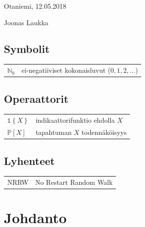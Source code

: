 \documentclass[finnish, 12pt, a4paper, sci, utf8, pdfa]{aaltothesis}
\newcommand{\N}{\mathbb{N}}
\newcommand{\indicator}{\mathopen{\mathds{1}}}
\newcommand*{\prob}{\mathbb{P}}
\begin{document}
\vspace{5cm}
Otaniemi, 12.05.2018

\vspace{5mm}
{\hfill Joonas Laukka \hspace{1cm}}

\newpage


\thesistableofcontents



\subsection*{Symbolit}

\begin{tabular}{ll}
$\N_{0}$  & ei-negatiiviset kokonaisluvut (\( 0, 1, 2, \ldots \))  \\
\end{tabular}

\subsection*{Operaattorit}

\begin{tabular}{ll}
   $ \indicator \left\{ X \right\} $               & indikaattorifunktio ehdolla $ X $\\
   $ \prob \left[ X \right] $                      & tapahtuman $ X $ todennäköisyys\\
\end{tabular}

\subsection*{Lyhenteet}

\begin{tabular}{ll}
NRRW       & No Restart Random Walk\\
\end{tabular}


\cleardoublepage

\section{Johdanto}

\thispagestyle{empty}
\end{document}
